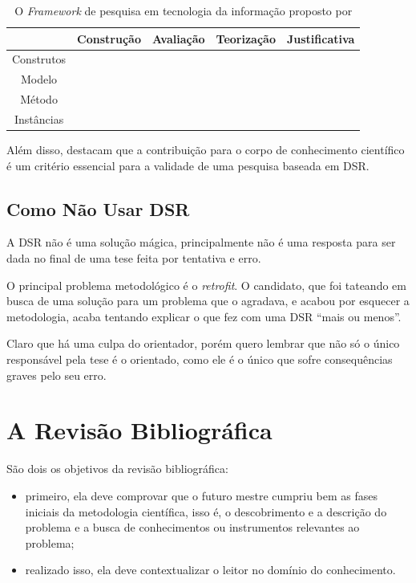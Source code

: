 \begin{table}[hbt]
    \centering
    \begin{tabular}{|c|c|c|c|c|}
    \hline
       & Construção & Avaliação & Teorização & Justificativa  \\    \hline
    Construtos &&&&\\     \hline
    Modelo &&&&\\    \hline
    Método &&&&\\    \hline
    Instâncias &&&&\\    \hline
    \end{tabular}
    \caption{O \textit{Framework} de pesquisa em tecnologia da informação proposto por \citet{march1995design}}
    \label{tab:marchsmith}
\end{table}

Além disso,  \citet{hevner2004design} destacam que a contribuição para o corpo de conhecimento científico é um critério essencial para a validade de uma pesquisa baseada em DSR.

\subsection{Como Não Usar  DSR}

A DSR não é uma solução mágica, principalmente não é uma resposta para ser dada no final de uma tese feita por tentativa e erro. 

O principal problema metodológico é o \textit{retrofit}. O candidato, que foi tateando em busca de uma solução para um problema que o agradava, e acabou por esquecer a metodologia, acaba tentando explicar o que fez com uma DSR ``mais ou menos''.

Claro que há uma culpa do orientador, porém quero lembrar que não só o único responsável pela tese é o orientado, como ele é o único que sofre consequências graves pelo seu erro.




\section{A Revisão Bibliográfica}


São dois os objetivos da revisão bibliográfica:
\begin{itemize}
    \item primeiro, ela deve comprovar que o futuro mestre cumpriu bem as fases iniciais da metodologia científica, isso é, o descobrimento e a descrição do problema e a busca de conhecimentos ou instrumentos relevantes ao problema;
    \item realizado isso, ela deve contextualizar o leitor no domínio do conhecimento. 
\end{itemize}

